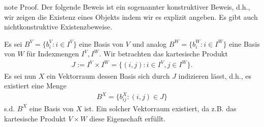\documentclass[letterpaper,10pt,english]{jupyterBook}
\begin{document}
\begin{sphinxadmonition}{note}
\sphinxAtStartPar
Proof. Der folgende Beweis ist ein sogenannter konstruktiver Beweis, d.h., wir zeigen die Existenz eines Objekts indem wir es explizit angeben. Es gibt auch nicht\sphinxhyphen{}konstruktive Existenzbeweise.

\sphinxAtStartPar
Es sei \(B^V = \{b_i^V: i\in I^V\}\) eine Basis von \(V\) und analog \(B^W = \{b_i^W: i\in I^W\}\)  eine Basis von \(W\) für Indexmengen \(I^V, I^W\). Wir betrachten das kartesische Produkt
\begin{equation*}
\begin{split}J := I^V \times I^W = \{(i,j): i\in I^V, j\in I^W\}.\end{split}
\end{equation*}
\sphinxAtStartPar
Es sei nun \(X\) ein Vektorraum dessen Basis sich durch \(J\) indizieren lässt, d.h., es existiert eine Menge
\begin{equation*}
\begin{split}B^X = \{b_{ij}^X: (i,j)\in J\}\end{split}
\end{equation*}
\sphinxAtStartPar
s.d. \(B^X\) eine Basis von \(X\) ist. Ein solcher Vektorraum existiert, da z.B. das kartesische Produkt \(V\times W\) diese Eigenschaft erfüllt.


\end{sphinxadmonition}
\end{document}
